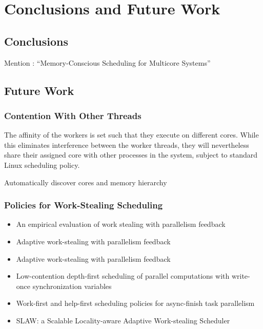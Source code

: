 
\chapter{Conclusions and Future Work}
\label{chap:locality-conclusions}

\section{Conclusions}
\label{sec:locality-conclusions-and-future-work-conclusions}


Mention \textcite{Majo2010}: ``Memory-Conscious Scheduling for Multicore Systems''


\section{Future Work}
\label{sec:locality-conclusions-and-future-work-future-work}

\subsection{Contention With Other Threads}

The affinity of the workers is set such that they execute on different
cores. While this eliminates interference between the worker threads,
they will nevertheless share their assigned core with other processes
in the system, subject to standard Linux scheduling policy.

Automatically discover cores and memory hierarchy

\subsection{Policies for Work-Stealing Scheduling}

\begin{itemize}
\item[\textbullet] An empirical evaluation of work stealing with
  parallelism feedback \cite{Agrawal2006}
\item[\textbullet] Adaptive work-stealing with parallelism feedback
  \cite{Agrawal2008}
\item[\textbullet] Adaptive work-stealing with parallelism feedback
  \cite{Agrawal2008a}
\item[\textbullet] Low-contention depth-first scheduling of parallel
  computations with write-once synchronization variables
  \cite{Fatourou2001}
\item[\textbullet] Work-first and help-first scheduling policies for
  async-finish task parallelism \cite{Guo2009}
\item[\textbullet] SLAW: a Scalable Locality-aware Adaptive
  Work-stealing Scheduler \cite{Guo2010}
\end{itemize}

